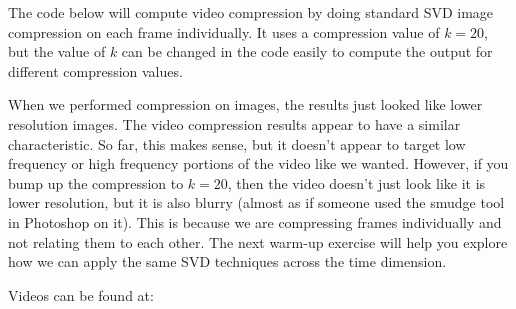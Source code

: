 The code below will compute video compression by doing standard SVD image compression on each frame individually. It uses a compression value of $k = 20$, but the value of $k$ can be changed in the code easily to compute the output for different compression values.


When we performed compression on images, the results just looked like lower resolution images. The video compression results appear to have a similar characteristic. So far, this makes sense, but it doesn't appear to target low frequency or high frequency portions of the video like we wanted. However, if you bump up the compression to $k = 20$, then the video doesn't just look like it is lower resolution, but it is also blurry (almost as if someone used the smudge tool in Photoshop on it). This is because we are compressing frames individually and not relating them to each other. The next warm-up exercise will help you explore how we can apply the same SVD techniques across the time dimension.

Videos can be found at:


